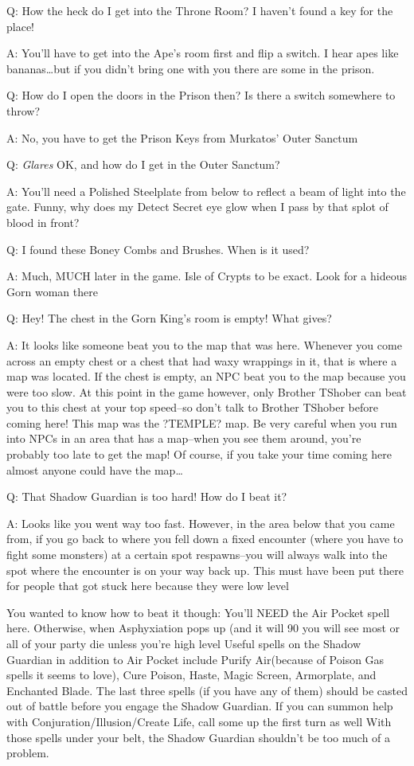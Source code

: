 \documentclass[12pt]{article}
\begin{document}
Q: How the heck do I get into the Throne Room? I haven't found a key for
the place!

A: You'll have to get into the Ape's room first and flip a switch. I
hear apes like bananas\ldots{}but if you didn't bring one with you there
are some in the prison.

Q: How do I open the doors in the Prison then? Is there a switch
somewhere to throw?

A: No, you have to get the Prison Keys from Murkatos' Outer Sanctum

Q: \emph{Glares} OK, and how do I get in the Outer Sanctum?

A: You'll need a Polished Steelplate from below to reflect a beam of
light into the gate. Funny, why does my Detect Secret eye glow when I
pass by that splot of blood in front?

Q: I found these Boney Combs and Brushes. When is it used?

A: Much, MUCH later in the game. Isle of Crypts to be exact. Look for a
hideous Gorn woman there

Q: Hey! The chest in the Gorn King's room is empty! What gives?

A: It looks like someone beat you to the map that was here. Whenever you
come across an empty chest or a chest that had waxy wrappings in it,
that is where a map was located. If the chest is empty, an NPC beat you
to the map because you were too slow. At this point in the game however,
only Brother TShober can beat you to this chest at your top speed--so
don't talk to Brother TShober before coming here! This map was the
?TEMPLE? map. Be very careful when you run into NPCs in an area that has
a map--when you see them around, you're probably too late to get the
map! Of course, if you take your time coming here almost anyone could
have the map\ldots{}

Q: That Shadow Guardian is too hard! How do I beat it?

A: Looks like you went way too fast. However, in the area below that you
came from, if you go back to where you fell down a fixed encounter
(where you have to fight some monsters) at a certain spot respawns--you
will always walk into the spot where the encounter is on your way back
up. This must have been put there for people that got stuck here because
they were low level

You wanted to know how to beat it though:  You'll NEED the Air Pocket spell
here.  Otherwise, when Asphyxiation pops up (and it will 90%
you will see most or all of your party die unless you're high level
Useful spells on the Shadow Guardian in addition to Air Pocket include
Purify Air(because of Poison Gas spells it seems to love), Cure Poison,
Haste, Magic Screen, Armorplate, and Enchanted Blade.  The last three
spells (if you have any of them) should be casted out of battle before you
engage the Shadow Guardian.  If you can summon help with
Conjuration/Illusion/Create Life, call some up the first turn as well
With those spells under your belt, the Shadow Guardian shouldn't be too
much of a problem.
\end{document}
